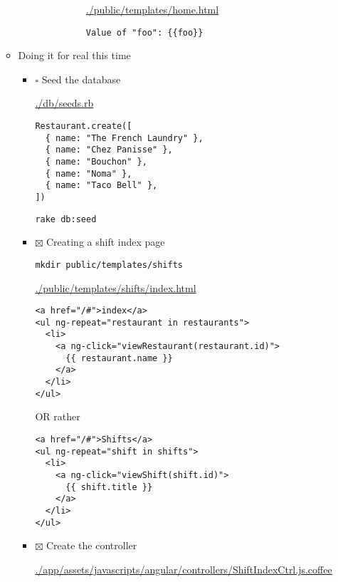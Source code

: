 \documentclass[11pt]{article}
\begin{document}
\begin{itemize}
\begin{itemize}
\begin{itemize}
\begin{itemize}
\begin{itemize}
\begin{itemize}
\url{./public/templates/home.html}

\begin{verbatim}
Value of "foo": {{foo}}
\end{verbatim}
\end{itemize}
\end{itemize}
\end{itemize}
\end{itemize}

\item Doing it for real this time
\label{sec-1-3-3-1-0-4}

\begin{itemize}
\item $\square$ Seed the database

\url{./db/seeds.rb}

\begin{verbatim}
Restaurant.create([
  { name: "The French Laundry" },
  { name: "Chez Panisse" },
  { name: "Bouchon" },
  { name: "Noma" },
  { name: "Taco Bell" },
])
\end{verbatim}

\begin{verbatim}
rake db:seed
\end{verbatim}

\item $\boxtimes$ Creating a shift index page

\begin{verbatim}
mkdir public/templates/shifts
\end{verbatim}

\url{./public/templates/shifts/index.html}

\begin{verbatim}
<a href="/#">index</a>
<ul ng-repeat="restaurant in restaurants">
  <li>
    <a ng-click="viewRestaurant(restaurant.id)">
      {{ restaurant.name }}
    </a>
  </li>
</ul>
\end{verbatim}

OR rather

\begin{verbatim}
<a href="/#">Shifts</a>
<ul ng-repeat="shift in shifts">
  <li>
    <a ng-click="viewShift(shift.id)">
      {{ shift.title }}
    </a>
  </li>
</ul>
\end{verbatim}

\item $\boxtimes$ Create the controller

\url{./app/assets/javascripts/angular/controllers/ShiftIndexCtrl.js.coffee}


\end{itemize}
\end{itemize}
\end{itemize}
\end{document}
